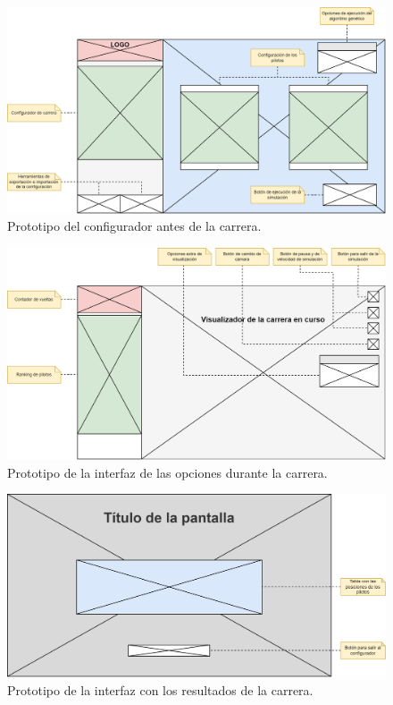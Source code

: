 \begin{figure}[H]
    \centering
    \includegraphics[width=\textwidth]{imagenes/pag1-proto.png}
    \caption{Prototipo del configurador antes de la carrera.}
    \label{fig:protoconfig}
 \end{figure}

 \begin{figure}[H]
    \centering
    \includegraphics[width=\textwidth]{imagenes/pag2-proto.png}
    \caption{Prototipo de la interfaz de las opciones durante la carrera.}
    \label{fig:protoranking}
 \end{figure}

 \begin{figure}[H]
    \centering
    \includegraphics[width=\textwidth]{imagenes/proto-pantallafinal.png}
    \caption{Prototipo de la interfaz con los resultados de la carrera.}
    \label{fig:protopantallafinal}
 \end{figure}

